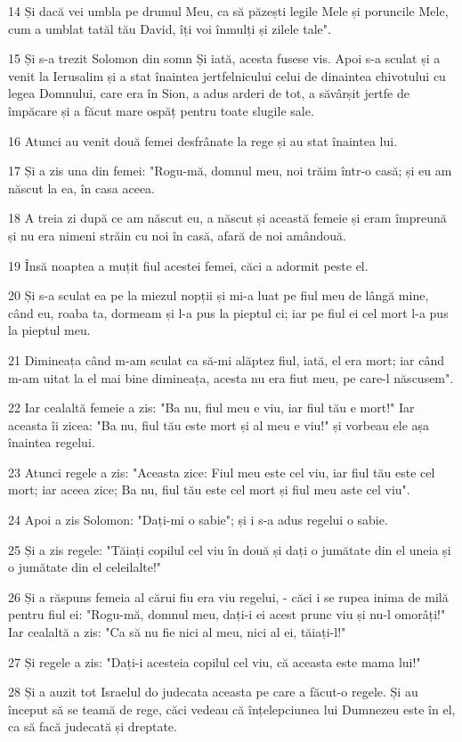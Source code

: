 \par 14 Și dacă vei umbla pe drumul Meu, ca să păzești legile Mele și poruncile Mele, cum a umblat tatăl tău David, îți voi înmulți și zilele tale".
\par 15 Și s-a trezit Solomon din somn Și iată, acesta fusese vis. Apoi s-a sculat și a venit la Ierusalim și a stat înaintea jertfelnicului celui de dinaintea chivotului cu legea Domnului, care era în Sion, a adus arderi de tot, a săvârșit jertfe de împăcare și a făcut mare ospăț pentru toate slugile sale.
\par 16 Atunci au venit două femei desfrânate la rege și au stat înaintea lui.
\par 17 Și a zis una din femei: "Rogu-mă, domnul meu, noi trăim într-o casă; și eu am născut la ea, în casa aceea.
\par 18 A treia zi după ce am născut eu, a născut și această femeie și eram împreună și nu era nimeni străin cu noi în casă, afară de noi amândouă.
\par 19 Însă noaptea a muțit fiul acestei femei, căci a adormit peste el.
\par 20 Și s-a sculat ea pe la miezul nopții și mi-a luat pe fiul meu de lângă mine, când eu, roaba ta, dormeam și l-a pus la pieptul ci; iar pe fiul ei cel mort l-a pus la pieptul meu.
\par 21 Dimineața când m-am sculat ca să-mi alăptez fiul, iată, el era mort; iar când m-am uitat la el mai bine dimineața, acesta nu era fiut meu, pe care-l născusem".
\par 22 Iar cealaltă femeie a zis: "Ba nu, fiul meu e viu, iar fiul tău e mort!" Iar aceasta îi zicea: "Ba nu, fiul tău este mort și al meu e viu!" și vorbeau ele așa înaintea regelui.
\par 23 Atunci regele a zis: "Aceasta zice: Fiul meu este cel viu, iar fiul tău este cel mort; iar aceea zice; Ba nu, fiul tău este cel mort și fiul meu aste cel viu".
\par 24 Apoi a zis Solomon: "Dați-mi o sabie"; și i s-a adus regelui o sabie.
\par 25 Și a zis regele: "Tăiați copilul cel viu în două și dați o jumătate din el uneia și o jumătate din el celeilalte!"
\par 26 Și a răspuns femeia al cărui fiu era viu regelui, - căci i se rupea inima de milă pentru fiul ei: "Rogu-mă, domnul meu, dați-i ei acest prunc viu și nu-l omorâți!" Iar cealaltă a zis: "Ca să nu fie nici al meu, nici al ei, tăiați-l!"
\par 27 Și regele a zis: "Dați-i acesteia copilul cel viu, că aceasta este mama lui!"
\par 28 Și a auzit tot Israelul do judecata aceasta pe care a făcut-o regele. Și au început să se teamă de rege, căci vedeau că înțelepciunea lui Dumnezeu este în el, ca să facă judecată și dreptate.

